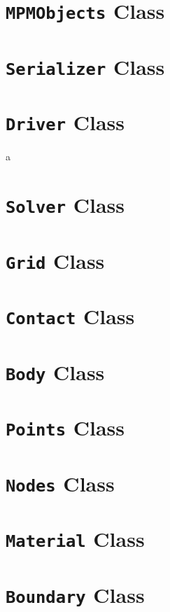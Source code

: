 \section{\texttt{MPMObjects} Class}

\section{\texttt{Serializer} Class}

\section{\texttt{Driver} Class}
a
\section{\texttt{Solver} Class}

\section{\texttt{Grid} Class}

\section{\texttt{Contact} Class}

\section{\texttt{Body} Class}

\section{\texttt{Points} Class}

\section{\texttt{Nodes} Class}

\section{\texttt{Material} Class}

\section{\texttt{Boundary} Class}